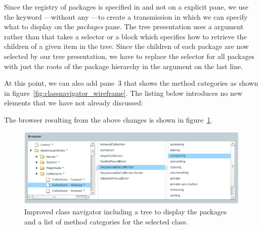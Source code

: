 \documentclass[a4paper,10pt,twoside]{book}
\begin{document}

Since the registry of packages is specified in  and not on
a explicit pane, we use the keyword ---without any
---to create a transmission in which we can specify what to
display on the \emph{packages} pane. The tree presentation uses a
 argument rather than  that takes a
selector or a block which specifies how to retrieve the children of a
given item in the tree. Since the children of each package are now
selected by our tree presentation, we have to replace the selector for
all packages with just the roots of the package hierarchy in the
 argument on the last line.

At this point, we can also add pane~3 that shows the method categories
as shown in figure~\ref{fig:classnavigator_wireframe}. The listing
below introduces no new elements that we have not already discussed:


The browser resulting from the above changes is shown in
figure~\ref{fig:treeandcategories}.

\begin{figure}[htbp]
\centerline{\includegraphics[width=\linewidth]{treeandcategories.pdf}}
\caption{	Improved class navigator including a tree to display the packages and a list of method categories for the selected class.}
\label{fig:treeandcategories}
\end{figure}
\end{document}
